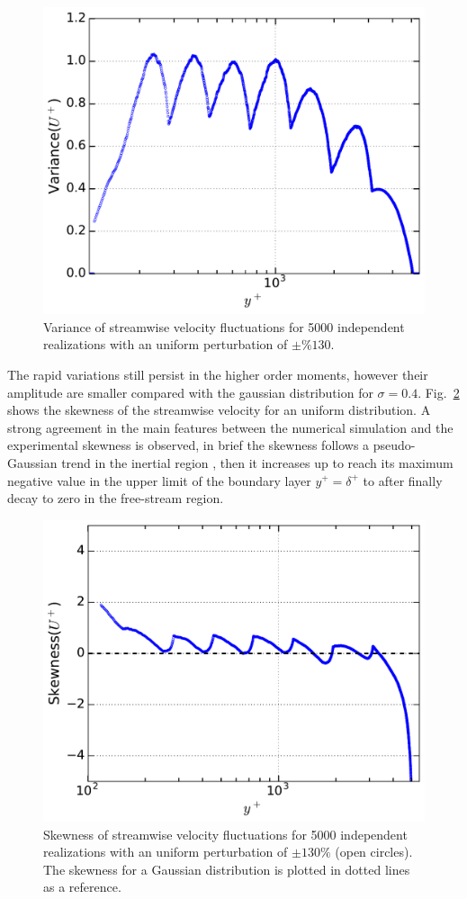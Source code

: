 \documentclass[aps,reprint,amsmath,amssymb,pra]{revtex4-1}%
\begin{document}
\begin{figure}[htb]
\includegraphics[scale=0.46]{figures/variance_5000_assembles_un130}
\caption{\label{fig:varun130} Variance of streamwise velocity fluctuations for 5000 independent realizations with an uniform perturbation of $\pm \%130$.}
\end{figure}     
The rapid variations still persist in the higher order moments, however their amplitude are smaller compared with the gaussian distribution for $\sigma=0.4$. Fig.~\ref{fig:skewun130} shows the skewness of the streamwise velocity for an uniform distribution. A strong agreement in the main features between the numerical simulation and the experimental skewness is observed, in brief the skewness follows a pseudo-Gaussian trend in the inertial region , then it increases up to reach its maximum negative value in the upper limit of the boundary layer $y^+=\delta^+$ to after finally decay to zero in the free-stream region.
\begin{figure}[tb]
\includegraphics[scale=0.46]{figures/skewness_5000_assembles_un130}
\caption{\label{fig:skewun130} Skewness of streamwise velocity fluctuations for 5000 independent realizations with an uniform perturbation of $\pm 130\%$ (open circles). The skewness for a Gaussian distribution is plotted in dotted lines as a reference.}
\end{figure}
\end{document}
